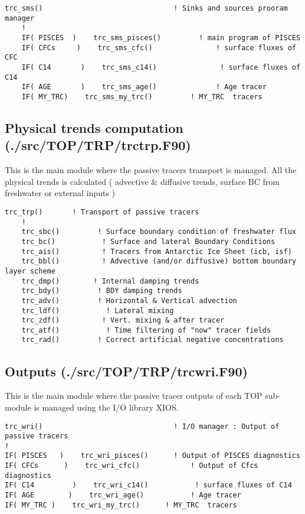 \documentclass[../main/TOP_manual]{subfiles}
\begin{document}
\begin{verbatim}
trc_sms()                               ! Sinks and sources prooram manager
    !
    IF( PISCES  )    trc_sms_pisces()         ! main program of PISCES
    IF( CFCs     )    trc_sms_cfc()               ! surface fluxes of CFC
    IF( C14       )    trc_sms_c14()               ! surface fluxes of C14
    IF( AGE       )    trc_sms_age()              ! Age tracer
    IF( MY_TRC)    trc_sms_my_trc()         ! MY_TRC  tracers
\end{verbatim}

\subsection*{Physical trends computation (./src/TOP/TRP/trctrp.F90)}

This is the main module where the passive tracers transport is managed. All the physical trends is calculated ( advective \& diffusive trends, surface BC from freshwater or external inputs )

\begin{verbatim}
trc_trp()       ! Transport of passive tracers
    !
    trc_sbc()         ! Surface boundary condition of freshwater flux
    trc_bc()           ! Surface and lateral Boundary Conditions
    trc_ais()          ! Tracers from Antarctic Ice Sheet (icb, isf)
    trc_bbl()          ! Advective (and/or diffusive) bottom boundary layer scheme
    trc_dmp()        ! Internal damping trends
    trc_bdy()         ! BDY damping trends
    trc_adv()         ! Horizontal & Vertical advection
    trc_ldf()           ! Lateral mixing
    trc_zdf()          ! Vert. mixing & after tracer
    trc_atf()           ! Time filtering of "now" tracer fields
    trc_rad()         ! Correct artificial negative concentrations
\end{verbatim}

\subsection*{Outputs  (./src/TOP/TRP/trcwri.F90)}

This is the main module where the passive tracer outputs of each TOP sub-module is managed using the I/O library XIOS.

\begin{verbatim}
trc_wri()                               ! I/O manager : Output of passive tracers
!
IF( PISCES   )    trc_wri_pisces()      ! Output of PISCES diagnostics
IF( CFCs      )    trc_wri_cfc()            ! Output of Cfcs diagnostics
IF( C14         )    trc_wri_c14()           ! surface fluxes of C14
IF( AGE        )    trc_wri_age()           ! Age tracer
IF( MY_TRC )    trc_wri_my_trc()      ! MY_TRC  tracers
\end{verbatim}
\end{document}

